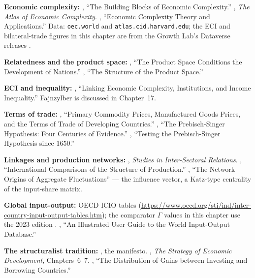 \documentclass[../structural_economics_book.tex]{subfiles}
\begin{document}
\textbf{Economic complexity:} \citet{hidalgo2009building}, ``The Building Blocks of Economic Complexity.'' \citet{hausmann2014atlas}, \textit{The Atlas of Economic Complexity}. \citet{hidalgo2021economic}, ``Economic Complexity Theory and Applications.'' Data: \texttt{oec.world} and \texttt{atlas.cid.harvard.edu}; the ECI and bilateral-trade figures in this chapter are from the Growth Lab's Dataverse releases \citep{growthlab2026atlas}.

\textbf{Relatedness and the product space:} \citet{hidalgo2007product}, ``The Product Space Conditions the Development of Nations.'' \citet{hausmann2007structure}, ``The Structure of the Product Space.''

\textbf{ECI and inequality:} \citet{hartmann2017linking}, ``Linking Economic Complexity, Institutions, and Income Inequality.'' Fajnzylber is discussed in Chapter~17.

\textbf{Terms of trade:} \citet{grilli1988primary}, ``Primary Commodity Prices, Manufactured Goods Prices, and the Terms of Trade of Developing Countries.'' \citet*{harvey2010prebisch}, ``The Prebisch-Singer Hypothesis: Four Centuries of Evidence.'' \citet*{arezki2014testing}, ``Testing the Prebisch-Singer Hypothesis since 1650.''

\textbf{Linkages and production networks:} \citet{rasmussen1956studies}, \textit{Studies in Inter-Sectoral Relations}. \citet{chenery1958international}, ``International Comparisons of the Structure of Production.'' \citet*{acemoglu2012network}, ``The Network Origins of Aggregate Fluctuations'' --- the influence vector, a Katz-type centrality of the input-share matrix.

\textbf{Global input-output:} OECD ICIO tables (\url{https://www.oecd.org/sti/ind/inter-country-input-output-tables.htm}); the comparator $\Gamma$ values in this chapter use the 2023 edition \citep{oecd2023icio}. \citet{timmer2015illustrated}, ``An Illustrated User Guide to the World Input-Output Database.''

\textbf{The structuralist tradition:} \citet{prebisch1949desarrollo}, the manifesto. \citet{hirschman1958strategy}, \textit{The Strategy of Economic Development}, Chapters~6--7. \citet{singer1950distribution}, ``The Distribution of Gains between Investing and Borrowing Countries.''
\end{document}
